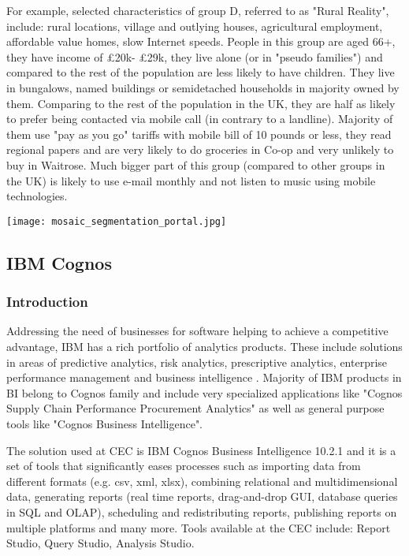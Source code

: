 For example, selected characteristics of group D, referred to as "Rural Reality", include: rural locations, village and outlying houses, agricultural employment, affordable value homes, slow Internet speeds. People in this group are aged 66+, they have income of £20k- £29k, they live alone (or in "pseudo families") and compared to the rest of the population are less likely to have children. They live in bungalows, named buildings or semidetached households in majority owned by them. Comparing to the rest of the population in the UK, they are half as likely to prefer being contacted via  mobile call (in contrary to a landline). Majority of them use "pay as you go" tariffs with mobile bill of 10 pounds or less, they read regional papers and are very likely to do groceries in Co-op and very unlikely to buy in Waitrose. Much bigger part of this group (compared to other groups in the UK) is likely to use e-mail monthly and not listen to music using mobile technologies. 

\begin{center}
  \texttt{[image: mosaic\_segmentation\_portal.jpg]}
  \label{normal_case}
\end{center}


		\subsection{IBM Cognos}
		
			\subsubsection{Introduction}
			
Addressing the need of businesses for software helping to achieve a competitive advantage, IBM has a rich portfolio of analytics products. These include solutions in areas of predictive analytics, risk analytics, prescriptive analytics, enterprise performance management and business intelligence \citep{IBM2015b}. Majority of IBM products in BI belong to Cognos family and include very specialized applications like "Cognos Supply Chain Performance Procurement Analytics" as well as general purpose tools like "Cognos Business Intelligence".

The solution used at CEC is IBM Cognos Business Intelligence 10.2.1 and it is a set of tools that significantly eases processes such as importing data from different formats (e.g. csv, xml, xlsx), combining relational and multidimensional data, generating reports (real time reports, drag-and-drop GUI, database queries in SQL and OLAP), scheduling and redistributing reports, publishing reports on multiple platforms and many more. Tools available at the CEC include: Report Studio, Query Studio, Analysis Studio.

